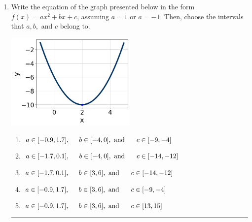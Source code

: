 \documentclass[14pt]{extbook}
\newcommand{\litem}[1]{\item#1\hspace*{-1cm}\rule{\textwidth}{0.4pt}}
\begin{document}
\begin{enumerate}
{\begin{enumerate}[label=\Alph*.]
\end{enumerate} }
\litem{
Write the equation of the graph presented below in the form $f(x)=ax^2+bx+c$, assuming  $a=1$ or $a=-1$. Then, choose the intervals that $a, b,$ and $c$ belong to.
\begin{center}
    \includegraphics[width=0.5\textwidth]{../Figures/quadraticGraphToEquationCopyB.png}
\end{center}
\begin{enumerate}[label=\Alph*.]
\item \( a \in [-0.9, 1.7], \hspace*{5mm} b \in [-4, 0], \text{ and } \hspace*{5mm} c \in [-9, -4] \)
\item \( a \in [-1.7, 0.1], \hspace*{5mm} b \in [-4, 0], \text{ and } \hspace*{5mm} c \in [-14, -12] \)
\item \( a \in [-1.7, 0.1], \hspace*{5mm} b \in [3, 6], \text{ and } \hspace*{5mm} c \in [-14, -12] \)
\item \( a \in [-0.9, 1.7], \hspace*{5mm} b \in [3, 6], \text{ and } \hspace*{5mm} c \in [-9, -4] \)
\item \( a \in [-0.9, 1.7], \hspace*{5mm} b \in [3, 6], \text{ and } \hspace*{5mm} c \in [13, 15] \)

\end{enumerate} }
\end{enumerate}
\end{document}
